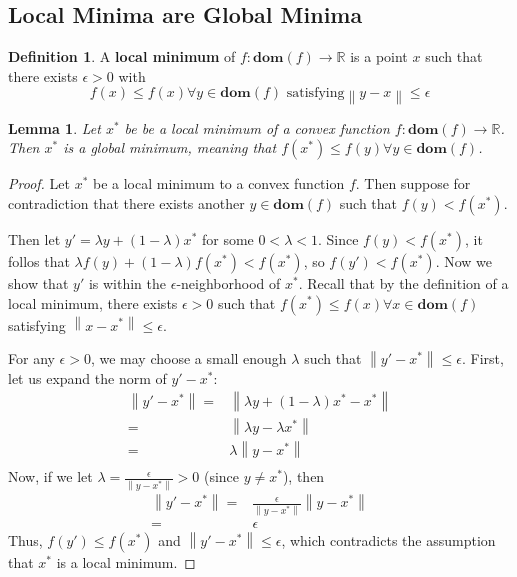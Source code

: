 \documentclass[10pt]{article}
\newcommand{\norm}[1]{\left\lVert#1\right\rVert}					%
\newcommand{\R}{\mathbb{R}}
\newcommand{\domain}[1]{\mathbf{dom}(#1)}
\newtheorem{lemma}[theorem]{Lemma}
\theoremstyle{remark}
\theoremstyle{definition}
\newtheorem{definition}[theorem]{Definition}
\begin{document}
\subsection{Local Minima are Global Minima}
\begin{definition}
	A \textbf{local minimum} of $f : \domain{f} \to \R$ is a point $x$ such that 
	there exists $\epsilon >0$ with 
	\begin{equation}
		f(x) \leq f(x) \forall y \in \domain{f} \text{ satisfying} \norm{y-x} \leq \epsilon
	\end{equation}
\end{definition}

\begin{lemma}
	Let $x^*$ be be a local minimum of a convex function $f: \domain{f} \to \R$. 
	Then $x^*$ is a global minimum, meaning that $f(x^*) \leq f(y) \forall y \in \domain{f}$.
\end{lemma}
\begin{proof}
	Let $x^*$ be a local minimum to a convex function $f$. Then suppose for 
	contradiction that there exists another $y \in \domain{f}$ such that 
	$f(y) < f(x^*)$.

	Then let $y' = \lambda y + (1-\lambda)x^*$ for some $0 < \lambda < 1$.
	Since $f(y) < f(x^*)$, it follos that $\lambda f(y) + (1-\lambda)f(x^*) < f(x^*)$,
	so $f(y') < f(x^*)$. Now we show that $y'$ is within the $\epsilon$-neighborhood of $x^*$.
	Recall that by  the definition of a local minimum, there exists $\epsilon >0$ such that
	$f(x^*) \leq f(x) \forall x \in \domain{f}$ satisfying $\norm{x-x^*} \leq \epsilon$.
	
	For any $\epsilon >0$, we may choose a small enough $\lambda $ such 
	that $\norm{y'-x^*} \leq \epsilon$. First, let us expand the norm of $y'-x^*$:
	\begin{align*}
		\norm{y'-x^*} =& \norm{\lambda y + (1-\lambda)x^* - x^*}\\
		=& \norm{\lambda y - \lambda x^*}\\
		=& \lambda \norm{y-x^*}\\
	\end{align*}
	Now, if we let $\lambda = \frac{\epsilon}{\norm{y-x^*}} >0$ (since $y\neq x^*$), then 
	\begin{align*}
		\norm{y'-x^*} =& \frac{\epsilon}{\norm{y-x^*}}\norm{y-x^*}\\
		=& \epsilon
	\end{align*}
	Thus, $f(y') \leq f(x^*)$ and $\norm{y'-x^*} \leq \epsilon$, which contradicts 
	the assumption that $x^*$ is a local minimum.
\end{proof}
\end{document}
